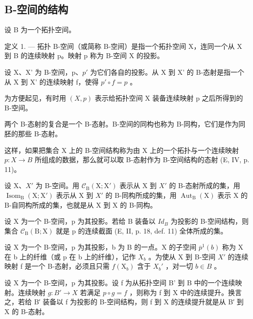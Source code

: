 \subsection{B-空间的结构}

设 B 为一个拓扑空间。

定义 1. --- 拓扑 B-空间（或简称 B-空间）是指一个拓扑空间 X，连同一个从 X 到 B 的连续映射 p。映射 p 称为 B-空间 X 的投影。

设 X、X' 为 B-空间，p、\(p'\) 为它们各自的投影。从 X 到 X' 的 B-态射是指一个从 X 到 X' 的连续映射 f，使得 \(p' \circ f = p\) 。

为方便起见，有时用 \((X,p)\) 表示给拓扑空间 X 装备连续映射 p 之后所得到的 B-空间。

两个 B-态射的复合是一个 B-态射。B-空间的同构也称为 B-同构，它们是作为同胚的那些 B-态射。

这样，如果把集合 X 上的 B-空间结构称为由 X 上的一个拓扑与一个连续映射 \(p: X \rightarrow B\) 所组成的数据，那么就可以取 B-态射作为 B-空间结构的态射 (E, IV, p. 11)。

设 X、\(X'\) 为 B-空间。用 \(\mathcal{C}_{\mathrm{B}}(\mathrm{X};\mathrm{X}')\) 表示从 X 到 \(X'\) 的 B-态射所成的集，用 \(\operatorname{Isom}_{\mathrm{B}}(\mathrm{X};\mathrm{X}')\) 表示从 X 到 \(X'\) 的 B-同构所成的集，用 \(\operatorname{Aut}_{\mathrm{B}}(\mathrm{X})\) 表示 X 的 B-自同构所成的集，也就是从 X 到 X 的 B-同构。

设 X 为一个 B-空间，p 为其投影。若给 B 装备以 \(Id_{B}\) 为投影的 B-空间结构，则集合 \(\mathcal{C}_{\mathrm{B}}(\mathrm{B};\mathrm{X})\) 就是 p 的连续截面 (E, II, p. 18, def. 11) 全体所成的集。

设 X 为一个 B-空间，p 为其投影，b 为 B 的一点。X 的子空间 \(\overline{p}^{1}(b)\) 称为 X 在 b 上的纤维（或 p 在 b 上的纤维），记作 \(X_{b}\) 。为使从 X 到 B-空间 \(X'\) 的连续映射 f 是一个 B-态射，必须且只需 \(f(\mathrm{X}_{b})\) 含于 \(X_{b}'\) ，对一切 \(b \in B\) 。

设 X 为一个 B-空间，p 为其投影。设 f 为从拓扑空间 B' 到 B 中的一个连续映射。连续映射 \(g: B' \to X\) 若满足 \(p \circ g = f\) ，则称为 f 到 X 中的连续提升。换言之，若给 B′ 装备以 f 为投影的 B-空间结构，则 f 到 X 的连续提升就是从 B′ 到 X 的 B-态射。

